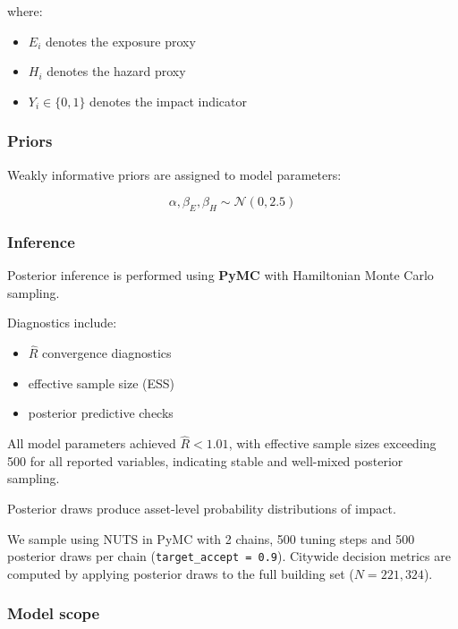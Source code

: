 \documentclass[
]{article}
\providecommand{\tightlist}{%
  \setlength{\itemsep}{0pt}\setlength{\parskip}{0pt}}
\begin{document}
where:

\begin{itemize}
\tightlist
\item
  \(E_i\) denotes the exposure proxy
\item
  \(H_i\) denotes the hazard proxy
\item
  \(Y_i \in \{0,1\}\) denotes the impact indicator
\end{itemize}

\subsubsection{Priors}\label{priors}

Weakly informative priors are assigned to model parameters:

\[
\alpha, \beta_E, \beta_H \sim \mathcal{N}(0, 2.5)
\]

\subsubsection{Inference}\label{inference}

Posterior inference is performed using \textbf{PyMC} with Hamiltonian
Monte Carlo sampling.

Diagnostics include:

\begin{itemize}
\tightlist
\item
  \(\hat{R}\) convergence diagnostics
\item
  effective sample size (ESS)
\item
  posterior predictive checks
\end{itemize}

All model parameters achieved \(\hat{R} < 1.01\), with effective sample
sizes exceeding 500 for all reported variables, indicating stable and
well-mixed posterior sampling.

Posterior draws produce asset-level probability distributions of impact.

We sample using NUTS in PyMC with 2 chains, 500 tuning steps and 500
posterior draws per chain (\texttt{target\_accept\ =\ 0.9}). Citywide
decision metrics are computed by applying posterior draws to the full
building set (\(N = 221{,}324\)).

\subsubsection{Model scope}\label{model-scope}
\end{document}
